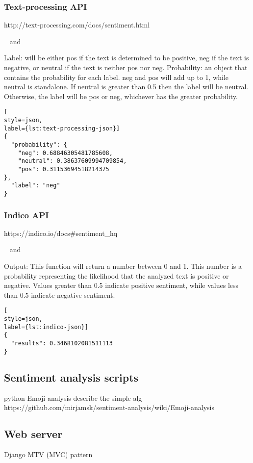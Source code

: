 \subsubsection*{Text-processing API}
\begin{description}
\singlespacing
 \item[Web url:] http://text-processing.com/docs/sentiment.html
 \item[Database columns:]  and 
\end{description}
Label:	will be either pos if the text is determined to be positive, neg if the text is negative, or neutral if the text is neither pos nor neg.
Probability:	an object that contains the probability for each label. neg and pos will add up to 1, while neutral is standalone. If neutral is greater than 0.5 then the label will be neutral. Otherwise, the label will be pos or neg, whichever has the greater probability.
\begin{lstlisting}[
style=json,
label={lst:text-processing-json}]
{
  "probability": {
    "neg": 0.68846305481785608,
    "neutral": 0.38637609994709854,
    "pos": 0.31153694518214375
},
  "label": "neg"
}
\end{lstlisting}

\subsubsection*{Indico API}
\begin{description}
\singlespacing
 \item[Web url:] https://indico.io/docs\#sentiment\_hq
 \item[Database columns:]  and 
\end{description}
Output: 
This function will return a number between 0 and 1. This number is a probability representing the likelihood that the analyzed text is positive or negative. Values greater than 0.5 indicate positive sentiment, while values less than 0.5 indicate negative sentiment.
\begin{lstlisting}[
style=json,
label={lst:indico-json}]
{
  "results": 0.3468102081511113
}
\end{lstlisting}

\subsection{Sentiment analysis scripts\label{sec:scripts}}
python
Emoji analysis
describe the simple alg 
https://github.com/mirjamsk/sentiment-analysis/wiki/Emoji-analysis

\subsection{Web server\label{sec:web-server}}
Django
MTV (MVC) pattern
